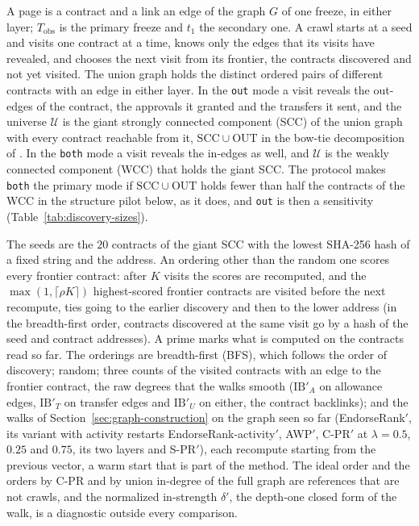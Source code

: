 A page is a contract and a link an edge of the graph $G$ of one freeze, in either layer; $T_{\mathrm{obs}}$ is the primary freeze and $t_1$ the secondary one. A crawl starts at a seed and visits one contract at a time, knows only the edges that its visits have revealed, and chooses the next visit from its frontier, the contracts discovered and not yet visited. The union graph holds the distinct ordered pairs of different contracts with an edge in either layer. In the \texttt{out} mode a visit reveals the out-edges of the contract, the approvals it granted and the transfers it sent, and the universe $\mathcal{U}$ is the giant strongly connected component (SCC) of the union graph with every contract reachable from it, $\mathrm{SCC}\cup\mathrm{OUT}$ in the bow-tie decomposition of \textcite{broder2000graph}. In the \texttt{both} mode a visit reveals the in-edges as well, and $\mathcal{U}$ is the weakly connected component (WCC) that holds the giant SCC. The protocol makes \texttt{both} the primary mode if $\mathrm{SCC}\cup\mathrm{OUT}$ holds fewer than half the contracts of the WCC in the structure pilot below, as it does, and \texttt{out} is then a sensitivity (Table~\ref{tab:discovery-sizes}).

The seeds are the $20$ contracts of the giant SCC with the lowest SHA-256 hash of a fixed string and the address. An ordering other than the random one scores every frontier contract: after $K$ visits the scores are recomputed, and the $\max(1,\lceil\rho K\rceil)$ highest-scored frontier contracts are visited before the next recompute, ties going to the earlier discovery and then to the lower address (in the breadth-first order, contracts discovered at the same visit go by a hash of the seed and contract addresses). A prime marks what is computed on the contracts read so far. The orderings are breadth-first (BFS), which follows the order of discovery; random; three counts of the visited contracts with an edge to the frontier contract, the raw degrees that the walks smooth ($\mathrm{IB}'_A$ on allowance edges, $\mathrm{IB}'_T$ on transfer edges and $\mathrm{IB}'_U$ on either, the contract backlinks); and the walks of Section~\ref{sec:graph-construction} on the graph seen so far (EndorseRank$'$, its variant with activity restarts EndorseRank-activity$'$, AWP$'$, \mbox{C-PR}$'$ at $\lambda=0.5$, $0.25$ and $0.75$, its two layers and \mbox{S-PR}$'$), each recompute starting from the previous vector, a warm start that is part of the method. The ideal order and the orders by \mbox{C-PR} and by union in-degree of the full graph are references that are not crawls, and the normalized in-strength $\delta'$, the depth-one closed form of the walk, is a diagnostic outside every comparison.

